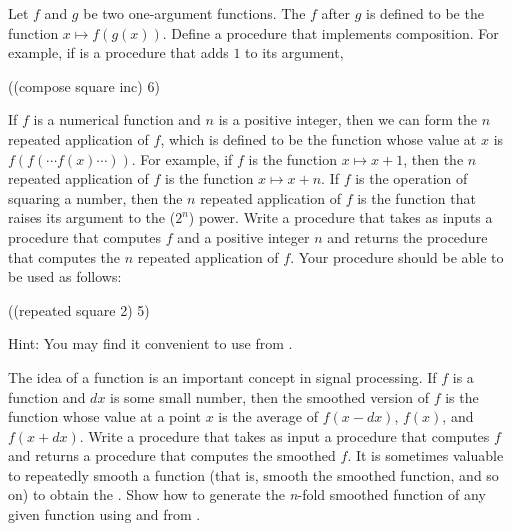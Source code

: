 \begin{exercise}
	\label{Exercise 1.42}
	Let \( f \) and \( g \) be two one-argument functions.
	The  \( f \) after \( g \) is defined to be the function \( x \mapsto f(g(x)) \).
	Define a procedure  that implements composition.
	For example, if  is a procedure that adds \( 1 \) to its argument,
	\begin{scheme}
	  ((compose square inc) 6)
	  ~~
	\end{scheme}
\end{exercise}

\begin{exercise}
	\label{Exercise 1.43}
	If \( f \) is a numerical function and \( n \) is a positive integer, then we can form the \( n \) repeated application of \( f \), which is defined to be the function whose value at \( x \) is \( f(f( \dotsm f(x) \dotsm )) \).
	For example, if \( f \) is the function \( x \mapsto x + 1 \), then the \( n \) repeated application of \( f \) is the function \( x \mapsto x + n \).
	If \( f \) is the operation of squaring a number, then the \( n \) repeated application of \( f \) is the function that raises its argument to the (\( 2^n \)) power.
	Write a procedure that takes as inputs a procedure that computes \( f \) and a positive integer \( n \) and returns the procedure that computes the \( n \) repeated application of \( f \).
	Your procedure should be able to be used as follows:
	\begin{scheme}
	  ((repeated square 2) 5)
	  ~\outprint{625}~
	\end{scheme}
	Hint:
	You may find it convenient to use  from .
\end{exercise}



\begin{exercise}
	\label{Exercise 1.44}
	The idea of  a function is an important concept in signal processing.
	If \( f \) is a function and \( dx \) is some small number, then the smoothed version of \( f \) is the function whose value at a point \( x \) is the average of \( f(x - dx) \), \( f(x) \), and \( f(x + dx) \).
	Write a procedure  that takes as input a procedure that computes \( f \) and returns a procedure that computes the smoothed \( f \).
	It is sometimes valuable to repeatedly smooth a function (that is, smooth the smoothed function, and so on) to obtain the .
	Show how to generate the \textit{n}-fold smoothed function of any given function using  and  from .
\end{exercise}



